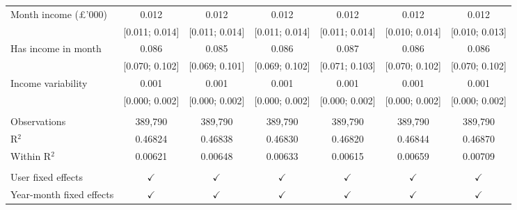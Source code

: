 \begin{tabular}{lcccccc}
   Month income (\pounds'000)  & 0.012          & 0.012          & 0.012          & 0.012            & 0.012            & 0.012\\   
                               & [0.011; 0.014] & [0.011; 0.014] & [0.011; 0.014] & [0.011; 0.014]   & [0.010; 0.014]   & [0.010; 0.013]\\   
   Has income in month         & 0.086          & 0.085          & 0.086          & 0.087            & 0.086            & 0.086\\   
                               & [0.070; 0.102] & [0.069; 0.101] & [0.069; 0.102] & [0.071; 0.103]   & [0.070; 0.102]   & [0.070; 0.102]\\   
   Income variability          & 0.001          & 0.001          & 0.001          & 0.001            & 0.001            & 0.001\\   
                               & [0.000; 0.002] & [0.000; 0.002] & [0.000; 0.002] & [0.000; 0.002]   & [0.000; 0.002]   & [0.000; 0.002]\\   
    \\
   Observations                & 389,790        & 389,790        & 389,790        & 389,790          & 389,790          & 389,790\\  
   R$^2$                       & 0.46824        & 0.46838        & 0.46830        & 0.46820          & 0.46844          & 0.46870\\  
   Within R$^2$                & 0.00621        & 0.00648        & 0.00633        & 0.00615          & 0.00659          & 0.00709\\  
    \\
   User fixed effects          & $\checkmark$   & $\checkmark$   & $\checkmark$   & $\checkmark$     & $\checkmark$     & $\checkmark$\\   
   Year-month fixed effects    & $\checkmark$   & $\checkmark$   & $\checkmark$   & $\checkmark$     & $\checkmark$     & $\checkmark$\\   
   \bottomrule
\end{tabular}
\par\endgroup


